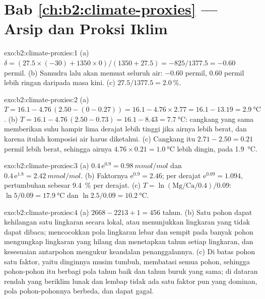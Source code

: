\section*{Bab \ref{ch:b2:climate-proxies} --- Arsip dan Proksi Iklim}

\begin{solution}{exo:b2:climate-proxies:1}
(a) $\delta = (27.5 \times (-30) + 1350 \times 0)/(1350 + 27.5) = -825/1377.5 = -0.60$ permil.
(b) Samudra lalu akan memuat seluruh air: $-0.60$ permil, \num{0.60} permil lebih ringan daripada
masa kini. (c) $27.5/1377.5 = \qty{2.0}{\percent}$.
\end{solution}

\begin{solution}{exo:b2:climate-proxies:2}
(a) $T = 16.1 - 4.76\,(2.50 - (0 - 0.27)) = 16.1 - 4.76 \times 2.77 = 16.1 - 13.19 =
\qty{2.9}{\celsius}$. (b) $T = 16.1 - 4.76\,(2.50 - 0.73) = 16.1 - 8.43 = \qty{7.7}{\celsius}$:
cangkang yang sama memberikan suhu hampir lima derajat lebih tinggi jika airnya lebih berat, dan karena itulah
komposisi air harus diketahui. (c) Cangkang itu $2.71 - 2.50 = 0.21$ permil lebih berat,
sehingga airnya $4.76 \times 0.21 = \qty{1.0}{\celsius}$ lebih dingin, pada \qty{1.9}{\celsius}.
\end{solution}

\begin{solution}{exo:b2:climate-proxies:3}
(a) $0.4\,\mathrm{e}^{0.9} = \qty{0.98}{mmol/mol}$ dan $0.4\,\mathrm{e}^{1.8} =
\qty{2.42}{mmol/mol}$. (b) Faktornya $\mathrm{e}^{0.9} = 2.46$; per derajat $\mathrm{e}^{0.09}
= 1.094$, pertumbuhan sebesar \qty{9.4}{\percent} per derajat. (c) $T = \ln(\text{Mg/Ca}/0.4)/0.09$:
$\ln 5/0.09 = \qty{17.9}{\celsius}$ dan $\ln 2.5/0.09 = \qty{10.2}{\celsius}$.
\end{solution}

\begin{solution}{exo:b2:climate-proxies:4}
(a) $2668 - 2213 + 1 = 456$ tahun. (b) Satu pohon dapat kehilangan satu lingkaran secara lokal, atau menunjukkan lingkaran
yang tidak dapat dibaca; mencocokkan pola lingkaran lebar dan sempit pada banyak pohon mengungkap
lingkaran yang hilang dan menetapkan tahun setiap lingkaran, dan kesesuaian antarpohon mengukur
keandalan penanggalannya. (c) Di batas pohon satu faktor, yaitu dinginnya musim tumbuh,
membatasi semua pohon, sehingga pohon-pohon itu berbagi pola tahun baik dan tahun buruk yang sama; di dataran rendah yang beriklim lunak dan
lembap tidak ada satu faktor pun yang dominan, pola pohon-pohonnya berbeda, dan  dapat gagal.
\end{solution}

